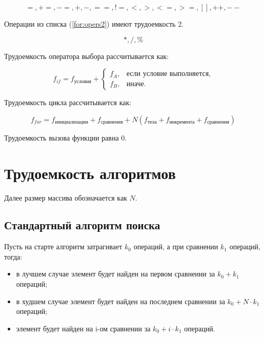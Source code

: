 \begin{equation}
	\label{for:opers}
	=, +=, -=, +, -, ==, !=, <, >, <=, >=, [], ++, {-}-
\end{equation}

Операции из списка (\ref{for:opers2}) имеют трудоемкость 2.

\begin{equation}
	\label{for:opers2}
	*, /, \%
\end{equation}

Трудоемкость оператора выбора  рассчитывается как:

\begin{equation}
	\label{for:if}
	f_{if} = f_{\text{условия}} +
	\begin{cases}
		f_A, & \text{если условие выполняется,}\\
		f_B, & \text{иначе.}
	\end{cases}
\end{equation}

Трудоемкость цикла рассчитывается как:

\begin{equation}
	\label{for:for}
	f_{for} = f_{\text{инициализации}} + f_{\text{сравнения}} + N(f_{\text{тела}} + f_{\text{инкремента}} + f_{\text{сравнения}})
\end{equation}

Трудоемкость вызова функции равна 0.

\section{Трудоемкость алгоритмов}

Далее размер массива обозначается как $N$.

\subsection{Стандартный алгоритм поиска}

Пусть на старте алгоритм затрагивает $k_0$ операций, а при сравнении $k_1$ операций, тогда:

\begin{itemize}
	\item в лучшем случае элемент будет найден на первом сравнении за $k_0 + k_1$ операций;
	\item в худшем случае элемент будет найден на последнем сравнении за $k_0 + N · k_1$ операций;
	\item элемент будет найден на i-ом сравнении за $k_0 + i · k_1$ операций.
\end{itemize}

